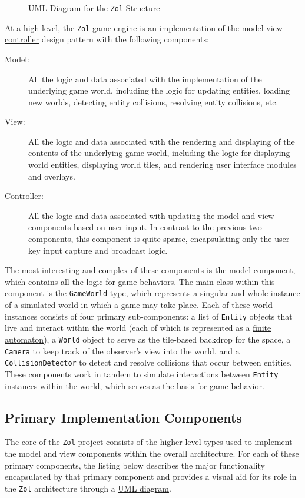 \documentclass{article}
\newcommand{\classname}[1] {\texttt{#1}}
\newcommand{\projectname}[0] {\texttt{Zol} }
\newcommand{\hreffsm}[1] {\href{http://en.wikipedia.org/wiki/Finite-state\_machine}{{\color{blue}\underline{#1}}}}
\newcommand{\hrefmvc}[1] {\href{http://en.wikipedia.org/wiki/Model\%E2\%80\%93view\%E2\%80\%93controller}{{\color{blue}\underline{#1}}}}
\newcommand{\insertdiagram}[2]
{
	\begin{figure}[H]
		\centering
		\fbox{\texttt{[image: figures/\#1]}}
		\caption{UML Diagram for the \classname{#1} Structure}
	\end{figure}
}
\begin{document}
	\insertdiagram{Zol}{3.0in}

	At a high level, the \projectname game engine is an implementation of the
    \hrefmvc{model-view-controller} design pattern with the following components:

	\begin{description}
		\item[Model:] All the logic and data associated with the implementation
		of the underlying game world, including the logic for updating entities,
		loading new worlds, detecting entity collisions, resolving entity
		collisions, etc.
		\item[View:] All the logic and data associated with the rendering and displaying
		of the contents of the underlying game world, including the logic for
		displaying world entities, displaying world tiles, and rendering user
		interface modules and overlays.
		\item[Controller:] All the logic and data associated with updating the
		model and view components based on user input.  In contrast to the
		previous two components, this component is quite sparse, encapsulating
		only the user key input capture and broadcast logic.
	\end{description}

	The most interesting and complex of these components is the model component,
	which contains all the logic for game behaviors.  The main class within this
	component is the \classname{GameWorld} type, which represents a singular and
	whole instance of a simulated world in which a game may take place.  Each
	of these world instances consists of four primary sub-components: a list of
	\classname{Entity} objects that live and interact within the world (each of
	which is represented as a \hreffsm{finite automaton}), a \classname{World}
	object to serve as the tile-based backdrop for the space, a \classname{Camera}
	to keep track of the observer's view into the world, and a
	\classname{CollisionDetector} to detect and resolve collisions that occur
	between entities.  These components work in tandem to simulate interactions
	between \classname{Entity} instances within the world, which serves as the
	basis for game behavior.

		\subsection[Primary Components]{Primary Implementation Components}
		The core of the \projectname project consists of the
		higher-level types used to implement the model and view components within
		the overall architecture.  For each of these primary components, the listing
		below describes the major functionality encapsulated by that primary component
		and provides a visual aid for its role in the \projectname architecture through a
        \href{http://en.wikipedia.org/wiki/Unified\_Modeling\_Language}{{\color{blue}\underline{UML diagram}}}.
\end{document}

